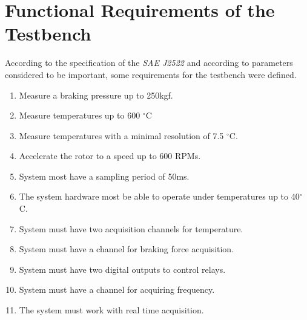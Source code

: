 \section{Functional Requirements of the Testbench}\label{sec:functionalRequirements}

	According to the specification of the \textit{SAE J2522} and according to parameters considered to be important, some requirements for the testbench were defined.

	\begin{enumerate}
		\item Measure a braking pressure up to 250kgf.\label{itm:func-req-1}
		\begin{comment}
		\item Apply a braking pressure of at least 300 kPa.\label{itm:func-req-2}
		\end{comment}
		\item Measure temperatures up to 600 $^{\circ}$C\label{itm:func-req-3}
		\item Measure temperatures with a minimal resolution of 7.5 $^{\circ}$C.\label{itm:func-req-4}
		\item Accelerate the rotor to a speed up to 600 RPMs.\label{itm:func-req-5}
		\item System most have a sampling period of 50ms.\label{itm:func-req-6}
		\item The system hardware most be able to operate under temperatures up to 40$^{\circ}$C.\label{itm:func-req-7}
		\item System must have two acquisition channels for temperature.\label{itm:func-req-8}
		\item System must have a channel for braking force acquisition.\label{itm:func-req-9}
		\begin{comment}
		\item System must have a channel for vibration acquisition.\label{itm:func-req-10}
		\end{comment}
		\item System must have two digital outputs to control relays.\label{itm:func-req-11}
		\item System must have a channel for acquiring frequency.\label{itm:func-req-12}
		\item The system must work with real time acquisition.\label{itm:func-req-13}
		\begin{comment}
		\item The system must be able to detect when the sensors from the acquisition channels are disconnected.\label{itm:func-req-14}
		\end{comment}
	\end{enumerate}

